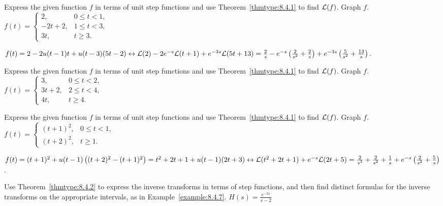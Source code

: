 \documentclass{ximera}
\begin{document}
\begin{problem}\label{exer:8.4.16} Express the given function $f$ in terms of unit step functions and use Theorem~\ref{thmtype:8.4.1} to find ${\cal L}(f)$.  Graph $f$.
$f(t)=\left\{\begin{array}{cl} 2,&0\le
t<1,\\ -2t+2,&1\le t<3,\\ 3t,&t\ge
3.\end{array}\right.$

\begin{solution}
$f(t)=2-2u(t-1)t+u(t-3)(5t-2)
\leftrightarrow {\cal L}(2)-2e^{-s}{\cal L}(t+1)+e^{-3s}{\cal
L}(5t+13)=
\frac{2}{s}-e^{-s}\left(\frac{2}{s^2}+\frac{2}{s}\right)+e^{-3s}\left(\frac{5}{s^2}+\frac{13}{s}\right)$.
\end{solution}
\end{problem}

\begin{problem}\label{exer:8.4.17}  Express the given function $f$ in terms of unit step functions and use Theorem~\ref{thmtype:8.4.1} to find ${\cal L}(f)$.  Graph $f$.
$f(t)=\left\{\begin{array}{cl}3,&0\le t<2,\\ 3t+2,&2\le
t<4,\\ 4t,&t\ge
4.\end{array}\right.$
\end{problem}

\begin{problem}\label{exer:8.4.18}  Express the given function $f$ in terms of unit step functions and use Theorem~\ref{thmtype:8.4.1} to find ${\cal L}(f)$.  Graph $f$.
$f(t)=\left\{\begin{array}{ll}(t+1)^2,&0\le t<1,
\\(t+2)^2,&t\ge1.\end{array}\right.$

\begin{solution}
$f(t)=(t+1)^2+u(t-1)\left((t+2)^2-(t+1)^2\right)
=t^2+2t+1+u(t-1)(2t+3)
\leftrightarrow
{\cal L}(t^2+2t+1)+e^{-s}{\cal L}(2t+5)=
\frac{2}{s^3 }+\frac{2}{s^2}+\frac{1}{s}+e^{-s}\left(\frac{2}{s^2}+\frac{5}{s}\right)$.
\end{solution}
\end{problem}

\begin{problem}\label{exer:8.4.19} Use Theorem~\ref{thmtype:8.4.2} to express the inverse transforms in terms of step functions, and then find distinct formulas for the inverse transforms on the appropriate intervals, as in
Example~\ref{example:8.4.7}.
$H(s)=\frac{e^{-2s}}{s-2}$
\end{problem}
\end{document}
